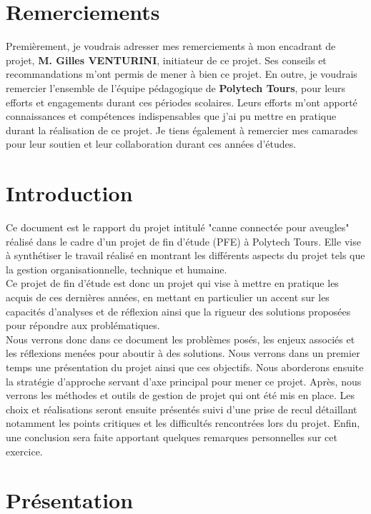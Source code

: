 \documentclass[UTF8]{EPURapport}
\begin{document}
\chapter{Remerciements}

Premièrement, je voudrais adresser mes remerciements à mon encadrant de projet, \textbf{M. Gilles VENTURINI}, initiateur de ce projet. Ses conseils et recommandations m'ont permis de mener à bien ce projet. En outre, je voudrais remercier l'ensemble de l'équipe pédagogique de \textbf{Polytech Tours}, pour leurs efforts et engagements durant ces périodes scolaires. Leurs efforts m'ont apporté connaissances et compétences indispensables que j'ai pu mettre en pratique durant la réalisation de ce projet. Je tiens également à remercier mes camarades pour leur soutien et leur collaboration durant ces années d'études. 

\chapter{Introduction}
Ce document est le rapport du projet intitulé "canne connectée pour aveugles" réalisé dans le cadre d'un projet de fin d'étude (PFE) à Polytech Tours. Elle vise à synthétiser le travail réalisé en montrant les différents aspects du projet tels que la gestion organisationnelle, technique et humaine.\\

Ce projet de fin d'étude est donc un projet qui vise à mettre en pratique les acquis de ces dernières années, en mettant en particulier un accent sur les capacités d'analyses et de réflexion ainsi que la rigueur des solutions proposées pour répondre aux problématiques.\\

Nous verrons donc dans ce document les problèmes posés, les enjeux associés et les réflexions menées pour aboutir à des solutions. Nous verrons dans un premier temps une présentation du projet ainsi que ces objectifs. Nous aborderons ensuite la stratégie d'approche servant d'axe principal pour mener ce projet. Après, nous verrons les méthodes et outils de gestion de projet qui ont été mis en place. Les choix et réalisations seront ensuite présentés suivi d'une prise de recul détaillant notamment les points critiques et les difficultés rencontrées lors du projet. Enfin, une conclusion sera faite apportant quelques remarques personnelles sur cet exercice.

\chapter{Présentation}
\end{document}
